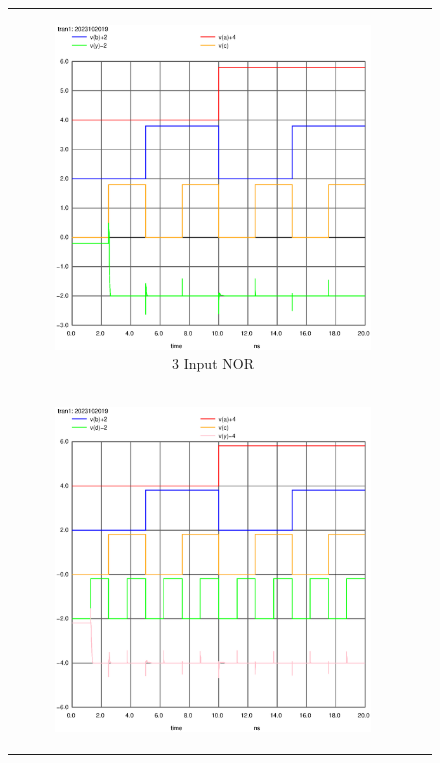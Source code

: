 \documentclass[conference]{IEEEtran}
\begin{document}
\begin{figure}[H]
\begin{tabular}{cc}
\begin{subfigure}{0.44\linewidth}
            \includegraphics[width=\textwidth]{images/nor_3_cmos_tran.eps}
            \caption{3 Input NOR}
        \end{subfigure} \\
        \begin{subfigure}{0.44\linewidth}
            \centering
            \includegraphics[width=\textwidth]{images/nor_4_cmos_tran.eps}

\end{subfigure}
\end{tabular}
\end{figure}
\end{document}
